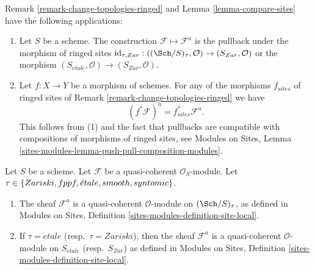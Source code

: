 \begin{remark}
\label{remark-change-topologies-ringed-sites}
Remark \ref{remark-change-topologies-ringed}
and
Lemma \ref{lemma-compare-sites}
have the following applications:
\begin{enumerate}
\item Let $S$ be a scheme.
The construction $\mathcal{F} \mapsto \mathcal{F}^a$ is
the pullback under the morphism of ringed sites
$\text{id}_{\tau, Zar} : ((\Sch/S)_\tau, \mathcal{O})
\to (S_{Zar}, \mathcal{O})$
or the morphism
$(S_{\acute{e}tale}, \mathcal{O}) \to (S_{Zar}, \mathcal{O})$.
\item Let $f : X \to Y$ be a morphism of schemes.
For any of the morphisms $f_{sites}$ of ringed sites of
Remark \ref{remark-change-topologies-ringed}
we have
$$
(f^*\mathcal{F})^a = f_{sites}^*\mathcal{F}^a.
$$
This follows from (1) and the fact that pullbacks are compatible with
compositions of morphisms of ringed sites, see
Modules on Sites,
Lemma \ref{sites-modules-lemma-push-pull-composition-modules}.
\end{enumerate}
\end{remark}

\begin{lemma}
\label{lemma-quasi-coherent-gives-quasi-coherent}
Let $S$ be a scheme.
Let $\mathcal{F}$ be a quasi-coherent $\mathcal{O}_S$-module.
Let $\tau \in \{Zariski, \linebreak[0] fppf, \linebreak[0]
\acute{e}tale, \linebreak[0] smooth, \linebreak[0] syntomic\}$.
\begin{enumerate}
\item The sheaf $\mathcal{F}^a$ is a quasi-coherent
$\mathcal{O}$-module on $(\Sch/S)_\tau$, as defined in
Modules on Sites, Definition \ref{sites-modules-definition-site-local}.
\item If $\tau = \acute{e}tale$ (resp.\ $\tau = Zariski$), then the sheaf
$\mathcal{F}^a$ is a quasi-coherent $\mathcal{O}$-module on
$S_{\acute{e}tale}$ (resp.\ $S_{Zar}$) as defined in
Modules on Sites, Definition \ref{sites-modules-definition-site-local}.
\end{enumerate}
\end{lemma}

